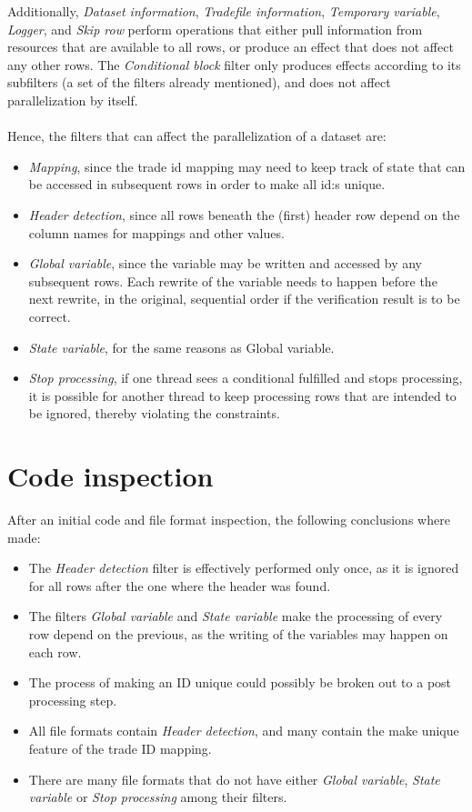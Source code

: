 Additionally, \textit{Dataset information}, \textit{Tradefile information}, \textit{Temporary variable}, \textit{Logger}, and \textit{Skip row} perform
operations that either pull information from resources that are available to all rows, or produce an effect that does not affect any other rows.
The \textit{Conditional block} filter only produces effects according to its subfilters (a set of the filters already mentioned), and does not affect parallelization by itself.
\\\\
Hence, the filters that can affect the parallelization of a dataset are:
\begin{itemize}
  \item \textit{Mapping}, since the trade id mapping may need to keep track of state that can be accessed in subsequent rows in order to make all id:s unique.
  \item \textit{Header detection}, since all rows beneath the (first) header row depend on the column names for mappings and other values.
  \item \textit{Global variable}, since the variable may be written and accessed by any subsequent rows. Each rewrite of the variable needs to happen before the next rewrite,
    in the original, sequential order if the verification result is to be correct.
  \item \textit{State variable}, for the same reasons as Global variable.
  \item \textit{Stop processing}, if one thread sees a conditional fulfilled and stops processing, it is possible for another thread to keep processing rows that are intended
    to be ignored, thereby violating the constraints.
\end{itemize}


\section{Code inspection}
After an initial code and file format inspection, the following conclusions where made:
\begin{itemize}
  \item The \textit{Header detection} filter is effectively performed only once, as it is ignored for all rows after the one where the header was found.
  \item The filters \textit{Global variable} and \textit{State variable} make the processing of every row depend on the previous, as the writing of the variables may happen on each row.
  \item The process of making an ID unique could possibly be broken out to a post processing step.
  \item All file formats contain \textit{Header detection}, and many contain the make unique feature of the trade ID mapping.
  \item There are many file formats that do not have either \textit{Global variable}, \textit{State variable} or \textit{Stop processing} among their filters.
\end{itemize}

